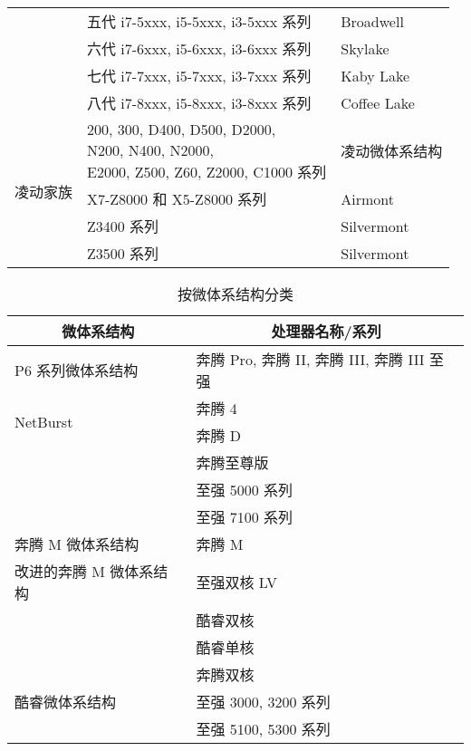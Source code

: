 \begin{multicols}{2}
\begin{table}[H]
\begin{tabular}{|c|l|l|}
\cline{2-3}          & 五代 i7-5xxx, i5-5xxx, i3-5xxx 系列 & Broadwell \\
\cline{2-3}          & 六代 i7-6xxx, i5-6xxx, i3-6xxx 系列 & Skylake \\
\cline{2-3}          & 七代 i7-7xxx, i5-7xxx, i3-7xxx 系列 & Kaby Lake \\
\cline{2-3}          & 八代 i7-8xxx, i5-8xxx, i3-8xxx 系列 & Coffee Lake \\
    \hline
    \multirow{4}[8]{*}{凌动家族} & \multicolumn{1}{p{16.5em}|}{200, 300, D400, D500, D2000,\newline{}N200, N400, N2000,\newline{}E2000, Z500, Z60, Z2000, C1000 系列} & 凌动微体系结构 \\
\cline{2-3}          & X7-Z8000 和 X5-Z8000 系列 & Airmont \\
\cline{2-3}          & Z3400 系列 & Silvermont \\
\cline{2-3}          & Z3500 系列 & Silvermont \\
    \hline
    \end{tabular}
\end{table}
\begin{table}[H]
  \centering
  \caption{按微体系结构分类}
  \scriptsize
    \begin{tabular}{|l|l|}
    \hline
    \multicolumn{1}{|c|}{\textbf{微体系结构}} & \multicolumn{1}{c|}{\textbf{处理器名称/系列}} \\
    \hline
    P6 系列微体系结构 & 奔腾 Pro, 奔腾 II, 奔腾 III, 奔腾 III 至强 \\
    \hline
    \multirow{2}[10]{*}{NetBurst} & 奔腾 4 \\
\cline{2-2}          & 奔腾 D \\
\cline{2-2}          & 奔腾至尊版 \\
\cline{2-2}          & 至强 5000 系列 \\
\cline{2-2}          & 至强 7100 系列 \\
    \hline
    奔腾 M 微体系结构 & 奔腾 M \\
    \hline
    \multirow{1}[6]{*}{改进的奔腾 M 微体系结构} & 至强双核 LV \\
\cline{2-2}          & 酷睿双核 \\
\cline{2-2}          & 酷睿单核 \\
    \hline
    \multirow{5}[16]{*}{酷睿微体系结构} & 奔腾双核 \\
\cline{2-2}          & 至强 3000, 3200 系列 \\
\cline{2-2}          & 至强 5100, 5300 系列 \\

\end{tabular}
\end{table}
\end{multicols}
